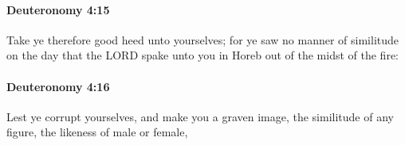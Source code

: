 		\paragraph{Deuteronomy 4:15} %
			\label{DEUTERONOMY-4-15}

			Take ye therefore good heed unto yourselves; for ye saw no manner of similitude on the day that the LORD spake unto you in Horeb out of the midst of the fire:


		\paragraph{Deuteronomy 4:16} %
			\label{DEUTERONOMY-4-16}

			Lest ye corrupt yourselves, and make you a graven image, the similitude of any figure, the likeness of male or female,


